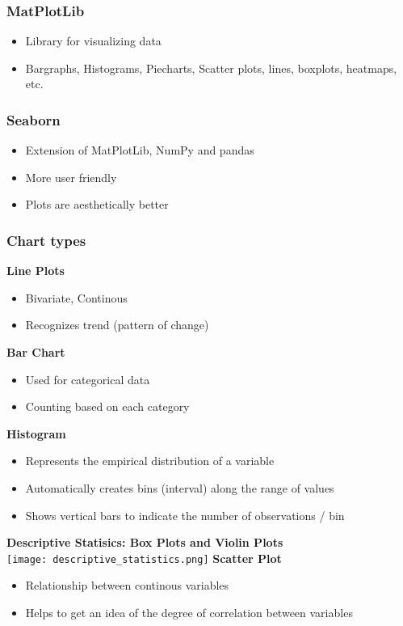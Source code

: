 \subsubsection{MatPlotLib}
\begin{itemize}
    \item Library for visualizing data
    \item Bargraphs, Histograms, Piecharts, Scatter plots, lines, boxplots, heatmaps, etc.
\end{itemize}

\subsubsection{Seaborn}
\begin{itemize}
    \item Extension of MatPlotLib, NumPy and pandas
    \item More user friendly
    \item Plots are aesthetically better
\end{itemize}

\subsubsection{Chart types}
\textbf{Line Plots}
\begin{itemize}
    \item Bivariate, Continous
    \item Recognizes trend (pattern of change)
\end{itemize}
\textbf{Bar Chart}
\begin{itemize}
    \item Used for categorical data
    \item Counting based on each category
\end{itemize}
\textbf{Histogram}
\begin{itemize}
    \item Represents the empirical distribution of a variable
    \item Automatically creates bins (interval) along the range of values
    \item Shows vertical bars to indicate the number of observations / bin
\end{itemize}
\textbf{Descriptive Statisics: Box Plots and Violin Plots}\\
\texttt{[image: descriptive\_statistics.png]}
\textbf{Scatter Plot}
\begin{itemize}
    \item Relationship between continous variables
    \item Helps to get an idea of the degree of correlation between variables
\end{itemize}